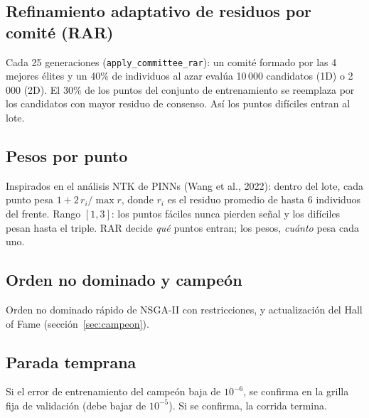 \documentclass[11pt,a4paper]{article}
\newcommand{\code}[1]{\texttt{\small #1}}
\begin{document}
\subsection{Refinamiento adaptativo de residuos por comité (RAR)}
Cada 25 generaciones (\code{apply\_committee\_rar}): un comité formado por las 4 mejores élites y un 40\%
de individuos al azar evalúa 10\,000 candidatos (1D) o 2\,000 (2D). El 30\% de los puntos del conjunto
de entrenamiento se reemplaza por los candidatos con mayor residuo de consenso. Así los puntos difíciles
entran al lote.

\subsection{Pesos por punto}\label{sec:pesos}
Inspirados en el análisis NTK de PINNs (Wang et al., 2022): dentro del lote, cada punto pesa
$1+2\,r_i/\max r$, donde $r_i$ es el residuo promedio de hasta 6 individuos del frente. Rango $[1,3]$:
los puntos fáciles nunca pierden señal y los difíciles pesan hasta el triple. RAR decide \emph{qué}
puntos entran; los pesos, \emph{cuánto} pesa cada uno.

\subsection{Orden no dominado y campeón}
Orden no dominado rápido de NSGA-II con restricciones, y actualización del Hall of Fame
(sección~\ref{sec:campeon}).

\subsection{Parada temprana}
Si el error de entrenamiento del campeón baja de $10^{-6}$, se confirma en la grilla fija de validación
(debe bajar de $10^{-5}$). Si se confirma, la corrida termina.
\end{document}
